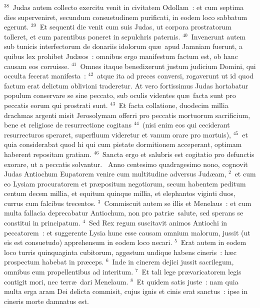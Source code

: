 ${}^{38}$~Judas autem collecto exercitu venit in civitatem Odollam~: et cum septima dies superveniret, secundum consuetudinem purificati, in eodem loco sabbatum egerunt.
${}^{39}$~Et sequenti die venit cum suis Judas, ut corpora prostratorum tolleret, et cum parentibus poneret in sepulchris paternis.
${}^{40}$~Invenerunt autem sub tunicis interfectorum de donariis idolorum qu\ae\ apud Jamniam fuerunt, a quibus lex prohibet Jud\ae os~: omnibus ergo manifestum factum est, ob hanc causam eos corruisse.
${}^{41}$~Omnes itaque benedixerunt justum judicium Domini, qui occulta fecerat manifesta~:
${}^{42}$~atque ita ad preces conversi, rogaverunt ut id quod factum erat delictum oblivioni traderetur. At vero fortissimus Judas hortabatur populum conservare se sine peccato, sub oculis videntes qu\ae\ facta sunt pro peccatis eorum qui prostrati sunt.
${}^{43}$~Et facta collatione, duodecim millia drachmas argenti misit Jerosolymam offerri pro peccatis mortuorum sacrificium, bene et religiose de resurrectione cogitans
${}^{44}$~(nisi enim eos qui ceciderant resurrecturos speraret, superfluum videretur et vanum orare pro mortuis),
${}^{45}$~et quia considerabat quod hi qui cum pietate dormitionem acceperant, optimam haberent repositam gratiam.
${}^{46}$~Sancta ergo et salubris est cogitatio pro defunctis exorare, ut a peccatis solvantur.
~\lettrine[lines=10,image=true,loversize=0.05,lraise=-0.03]{A}{}nno centesimo quadragesimo nono, cognovit Judas Antiochum Eupatorem venire cum multitudine adversus Jud\ae am,
${}^{2}$~et cum eo Lysiam procuratorem et pr\ae positum negotiorum, secum habentem peditum centum decem millia, et equitum quinque millia, et elephantos viginti duos, currus cum falcibus trecentos.
${}^{3}$~Commiscuit autem se illis et Menelaus~: et cum multa fallacia deprecabatur Antiochum, non pro patri\ae\ salute, sed sperans se constitui in principatum.
${}^{4}$~Sed Rex regum suscitavit animos Antiochi in peccatorem~: et suggerente Lysia hunc esse causam omnium malorum, jussit (ut eis est consuetudo) apprehensum in eodem loco necari.
${}^{5}$~Erat autem in eodem loco turris quinquaginta cubitorum, aggestum undique habens cineris~: h\ae c prospectum habebat in pr\ae ceps.
${}^{6}$~Inde in cinerem dejici jussit sacrilegum, omnibus eum propellentibus ad interitum.
${}^{7}$~Et tali lege pr\ae varicatorem legis contigit mori, nec terr\ae\ dari Menelaum.
${}^{8}$~Et quidem satis juste~: nam quia multa erga aram Dei delicta commisit, cujus ignis et cinis erat sanctus~: ipse in cineris morte damnatus est.


